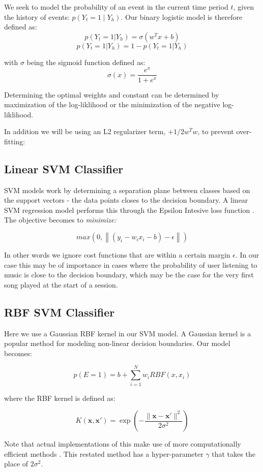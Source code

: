We seek to model the probability of an event in the current time period $t$, given the history of events: $p(Y_t =1 \mid Y_h)$. Our binary logistic model is therefore defined as:
$$p(Y_t = 1|Y_h) = \sigma(w^Tx + b)$$
$$p(Y_t = 1|Y_h) = 1 - p(Y_t = 1|Y_h)$$

with $\sigma$ being the sigmoid function defined as:
$$\sigma(x)=\frac{e^x}{1+e^x}$$

Determining the optimal weights and constant can be determined by maximization of the log-liklihood or the minimization of the negative log-liklihood. 

In addition we will be using an L2 regularizer term,  $ + 1/2w^Tw$, to prevent over-fitting:

\subsection{Linear SVM Classifier}

SVM models work by determining a separation plane between classes based on the support vectors - the data points closes to the decision boundary. A linear SVM regression model performs this through the Epsilon Intesive loss function \parencite{Vapnik}. The objective becomes to \textit{minimize:}

$$max(0,\left\| (y_i - w_i x_i - b) - \epsilon \right\|)$$

In other words we ignore cost functions that are within a certain margin  $\epsilon$. In our case this may be of importance in cases where the probability of user listening to music is close to the decision boundary, which may be the case for the very first song played at the start of a session.

\subsection{RBF SVM Classifier}

Here we use a Gaussian RBF kernel in our SVM model. A Gaussian kernel is a popular method for modeling non-linear decision boundaries. Our model becomes:

$$p(E=1)=b+\sum^N_{i=1}w_iRBF(x,x_i)$$

where the RBF kernel is defined as:

$$K(\mathbf {x} ,\mathbf {x'} )=\exp \left(-{\frac {\|\mathbf {x} -\mathbf {x'} \|^{2}}{2\sigma ^{2}}}\right)$$

Note that actual implementations of this make use of more computationally efficient methods \parencite{TFCookbook}. This restated method has a hyper-parameter $\gamma$ that takes the place of $2\sigma^2$.

